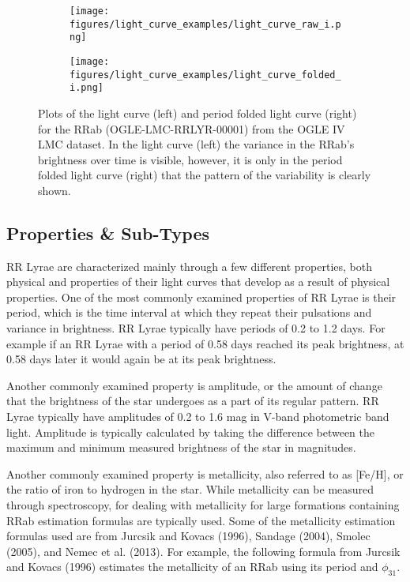 \documentclass[]{article}
\begin{document}
\begin{figure}
	\centering
	\begin{subfigure}{.5\textwidth}
		\centering
		\texttt{[image: figures/light\_curve\_examples/light\_curve\_raw\_i.png]}
		\label{fig:light_curve_raw_i}
	\end{subfigure}%
	\begin{subfigure}{.5\textwidth}
		\centering
		\texttt{[image: figures/light\_curve\_examples/light\_curve\_folded\_i.png]}
		\label{fig:sub2}
	\end{subfigure}
	\caption{Plots of the light curve (left) and period folded light curve (right) for the RRab (OGLE-LMC-RRLYR-00001) from the OGLE IV LMC dataset. In the light curve (left) the variance in the RRab’s brightness over time is visible, however, it is only in the period folded light curve (right) that the pattern of the variability is clearly shown.}
	\label{fig:light_curves}
\end{figure}

\subsection{Properties \& Sub-Types}

RR Lyrae are characterized mainly through a few different properties, both physical and properties of their light curves that develop as a result of physical properties. One of the most commonly examined properties of RR Lyrae is their period, which is the time interval at which they repeat their pulsations and variance in brightness. RR Lyrae typically have periods of 0.2 to 1.2 days. \cite{szczygiel_2009} For example if an RR Lyrae with a period of 0.58 days reached its peak brightness, at 0.58 days later it would again be at its peak brightness.

Another commonly examined property is amplitude, or the amount of change that the brightness of the star undergoes as a part of its regular pattern. RR Lyrae typically have amplitudes of 0.2 to 1.6 mag in V-band photometric band light. \cite{szczygiel_2009} Amplitude is typically calculated by taking the difference between the maximum and minimum measured brightness of the star in magnitudes. \cite{richards_2011}

Another commonly examined property is metallicity, also referred to as [Fe/H], or the ratio of iron to hydrogen in the star. \cite{jurcsik_1995} While metallicity can be measured through spectroscopy, for dealing with metallicity for large formations containing RRab estimation formulas are typically used. Some of the metallicity estimation formulas used are from Jurcsik and Kovacs (1996), Sandage (2004), Smolec (2005), and Nemec et al. (2013). \cite{jurcsik_1996, sandage_2004, smolec_2005, nemec_2013} For example, the following formula from Jurcsik and Kovacs (1996) estimates the metallicity of an RRab using its period and $\phi_{31}$. \cite{jurcsik_1996}
\end{document}
